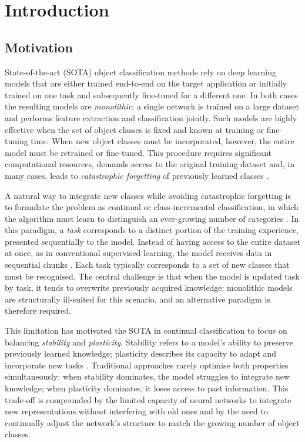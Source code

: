 \chapter{Introduction}
\label{ch:intro}

\section{Motivation}

State-of-the-art (SOTA) object classification methods rely on deep learning models that are either trained end-to-end on the target application or initially trained on one task and subsequently fine-tuned for a different one. In both cases the resulting models are \emph{monolithic}: a single network is trained on a large dataset and performs feature extraction and classification jointly. Such models are highly effective when the set of object classes is fixed and known at training or fine-tuning time. When new object classes must be incorporated, however, the entire model must be retrained or fine-tuned. This procedure requires significant computational resources, demands access to the original training dataset and, in many cases, leads to \emph{catastrophic forgetting} of previously learned classes \cite{catastrophic}.

A natural way to integrate new classes while avoiding catastrophic forgetting is to formulate the problem as continual or class-incremental classification, in which the algorithm must learn to distinguish an ever-growing number of categories \cite{vandeVen}. In this paradigm, a \emph{task} corresponds to a distinct portion of the training experience, presented sequentially to the model. Instead of having access to the entire dataset at once, as in conventional supervised learning, the model receives data in sequential chunks \cite{taskarithmeticloracontinual}. Each task typically corresponds to a set of new classes that must be recognised. The central challenge is that when the model is updated task by task, it tends to overwrite previously acquired knowledge: monolithic models are structurally ill-suited for this scenario, and an alternative paradigm is therefore required.

This limitation has motivated the SOTA in continual classification to focus on balancing \emph{stability} and \emph{plasticity}. Stability refers to a model's ability to preserve previously learned knowledge; plasticity describes its capacity to adapt and incorporate new tasks \cite{API}. Traditional approaches rarely optimise both properties simultaneously: when stability dominates, the model struggles to integrate new knowledge; when plasticity dominates, it loses access to past information. This trade-off is compounded by the limited capacity of neural networks to integrate new representations without interfering with old ones and by the need to continually adjust the network's structure to match the growing number of object classes.


